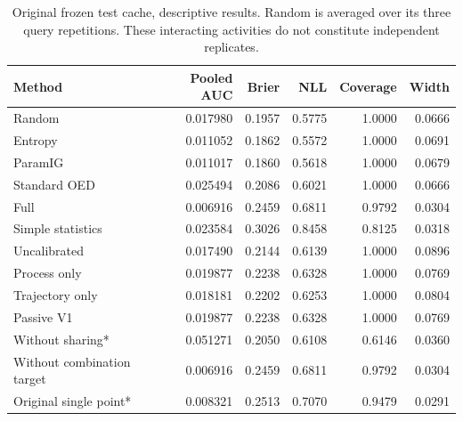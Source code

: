 \begin{table}[H]
\centering
\caption{Original frozen test cache, descriptive results. Random is averaged over its three query repetitions. These interacting activities do not constitute independent replicates.}
\label{tab:golden}
\scriptsize
\setlength{\tabcolsep}{3pt}
\begin{tabular}{lrrrrr}
\toprule
Method & Pooled AUC & Brier & NLL & Coverage & Width \\
\midrule
Random & 0.017980 & 0.1957 & 0.5775 & 1.0000 & 0.0666 \\
Entropy & 0.011052 & 0.1862 & 0.5572 & 1.0000 & 0.0691 \\
ParamIG & 0.011017 & 0.1860 & 0.5618 & 1.0000 & 0.0679 \\
Standard OED & 0.025494 & 0.2086 & 0.6021 & 1.0000 & 0.0666 \\
Full & 0.006916 & 0.2459 & 0.6811 & 0.9792 & 0.0304 \\
Simple statistics & 0.023584 & 0.3026 & 0.8458 & 0.8125 & 0.0318 \\
Uncalibrated & 0.017490 & 0.2144 & 0.6139 & 1.0000 & 0.0896 \\
Process only & 0.019877 & 0.2238 & 0.6328 & 1.0000 & 0.0769 \\
Trajectory only & 0.018181 & 0.2202 & 0.6253 & 1.0000 & 0.0804 \\
Passive V1 & 0.019877 & 0.2238 & 0.6328 & 1.0000 & 0.0769 \\
Without sharing* & 0.051271 & 0.2050 & 0.6108 & 0.6146 & 0.0360 \\
Without combination target & 0.006916 & 0.2459 & 0.6811 & 0.9792 & 0.0304 \\
Original single point* & 0.008321 & 0.2513 & 0.7070 & 0.9479 & 0.0291 \\
\bottomrule
\end{tabular}
\end{table}

